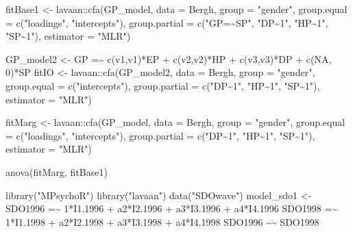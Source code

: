 \documentclass[
]{book}
\newenvironment{Shaded}{\begin{snugshade}}{\end{snugshade}}
\newcommand{\AttributeTok}[1]{\textcolor[rgb]{0.77,0.63,0.00}{#1}}
\newcommand{\FunctionTok}[1]{\textcolor[rgb]{0.00,0.00,0.00}{#1}}
\newcommand{\NormalTok}[1]{#1}
\newcommand{\OtherTok}[1]{\textcolor[rgb]{0.56,0.35,0.01}{#1}}
\newcommand{\SpecialCharTok}[1]{\textcolor[rgb]{0.00,0.00,0.00}{#1}}
\newcommand{\StringTok}[1]{\textcolor[rgb]{0.31,0.60,0.02}{#1}}
\begin{document}
\begin{Shaded}
\begin{Highlighting}[]
\NormalTok{fitBase1 }\OtherTok{\textless{}{-}}\NormalTok{ lavaan}\SpecialCharTok{::}\FunctionTok{cfa}\NormalTok{(GP\_model, }\AttributeTok{data =}\NormalTok{ Bergh, }\AttributeTok{group =} \StringTok{"gender"}\NormalTok{, }\AttributeTok{group.equal =} \FunctionTok{c}\NormalTok{(}\StringTok{"loadings"}\NormalTok{, }\StringTok{"intercepts"}\NormalTok{), }
                        \AttributeTok{group.partial =} \FunctionTok{c}\NormalTok{(}\StringTok{"GP=\textasciitilde{}SP"}\NormalTok{, }\StringTok{"DP\textasciitilde{}1"}\NormalTok{, }\StringTok{"HP\textasciitilde{}1"}\NormalTok{, }\StringTok{"SP\textasciitilde{}1"}\NormalTok{), }\AttributeTok{estimator =} \StringTok{"MLR"}\NormalTok{)}

\NormalTok{GP\_model2 }\OtherTok{\textless{}{-}} \StringTok{\textquotesingle{}GP =\textasciitilde{} c(v1,v1)*EP + c(v2,v2)*HP + c(v3,v3)*DP + c(NA, 0)*SP\textquotesingle{}}
\NormalTok{fitIO }\OtherTok{\textless{}{-}}\NormalTok{ lavaan}\SpecialCharTok{::}\FunctionTok{cfa}\NormalTok{(GP\_model2, }\AttributeTok{data =}\NormalTok{ Bergh, }\AttributeTok{group =} \StringTok{"gender"}\NormalTok{, }\AttributeTok{group.equal =} \FunctionTok{c}\NormalTok{(}\StringTok{"intercepts"}\NormalTok{), }
                     \AttributeTok{group.partial =} \FunctionTok{c}\NormalTok{(}\StringTok{"DP\textasciitilde{}1"}\NormalTok{, }\StringTok{"HP\textasciitilde{}1"}\NormalTok{, }\StringTok{"SP\textasciitilde{}1"}\NormalTok{), }\AttributeTok{estimator =} \StringTok{"MLR"}\NormalTok{)}

\NormalTok{fitMarg }\OtherTok{\textless{}{-}}\NormalTok{ lavaan}\SpecialCharTok{::}\FunctionTok{cfa}\NormalTok{(GP\_model, }\AttributeTok{data =}\NormalTok{ Bergh, }\AttributeTok{group =} \StringTok{"gender"}\NormalTok{, }\AttributeTok{group.equal =} \FunctionTok{c}\NormalTok{(}\StringTok{"loadings"}\NormalTok{, }\StringTok{"intercepts"}\NormalTok{),}
                       \AttributeTok{group.partial =} \FunctionTok{c}\NormalTok{(}\StringTok{"DP\textasciitilde{}1"}\NormalTok{, }\StringTok{"HP\textasciitilde{}1"}\NormalTok{, }\StringTok{"SP\textasciitilde{}1"}\NormalTok{), }\AttributeTok{estimator =} \StringTok{"MLR"}\NormalTok{)}

\FunctionTok{anova}\NormalTok{(fitMarg, fitBase1)}

\FunctionTok{library}\NormalTok{(}\StringTok{"MPsychoR"}\NormalTok{)}
\FunctionTok{library}\NormalTok{(}\StringTok{"lavaan"}\NormalTok{)}
\FunctionTok{data}\NormalTok{(}\StringTok{"SDOwave"}\NormalTok{)}
\NormalTok{model\_sdo1 }\OtherTok{\textless{}{-}} \StringTok{\textquotesingle{}}
\StringTok{  SDO1996 =\textasciitilde{} 1*I1.1996 + a2*I2.1996 + a3*I3.1996 + a4*I4.1996}
\StringTok{  SDO1998 =\textasciitilde{} 1*I1.1998 + a2*I2.1998 + a3*I3.1998 + a4*I4.1998}
\StringTok{  SDO1996 \textasciitilde{}\textasciitilde{} SDO1998}


\end{Highlighting}
\end{Shaded}
\end{document}
